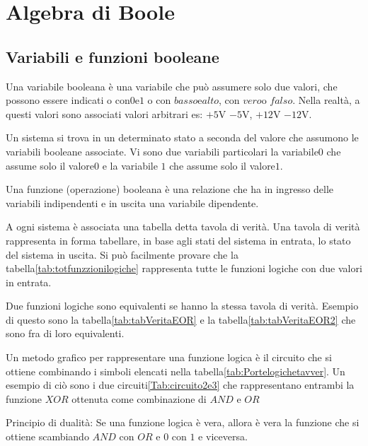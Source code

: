 \chapter{Algebra di Boole}
\label{cha:AlgebradiBoole}
\section{Variabili e funzioni booleane}
\label{sec:VariabiliBooleane}
Una variabile booleana è una variabile che può assumere solo due valori, che possono essere indicati o  con\nobs$0$\nobs e\nobs$1$ o con $basso$\nobs e\nobs$alto$, con $vero$\nobs o \nobs$falso$. Nella realtà, a questi valori sono  associati valori arbitrari es: $+5\si{\volt}$ $-5\si{\volt}$, $+12\si{\volt}$ $-12\si{\volt}$. 

 Un sistema si trova in un determinato stato a seconda del valore che assumono le variabili booleane associate.   Vi sono due variabili  particolari la variabile\nobs$0$ che assume solo il valore\nobs$0$ e la variabile \nobs$1$ che assume solo il valore\nobs$1$. 

Una funzione (operazione) booleana è una relazione  che ha in ingresso delle variabili indipendenti e in uscita una variabile dipendente.

A ogni sistema è associata una tabella detta tavola di verità. Una tavola di verità rappresenta in forma tabellare, in base agli stati del sistema in entrata, lo stato del sistema in uscita. Si può facilmente provare %
che la tabella\vref{tab:totfunzzionilogiche} rappresenta tutte le funzioni logiche con due valori in entrata.

Due funzioni logiche sono equivalenti se hanno la stessa tavola di verità. Esempio di questo sono la tabella\nobs\vref{tab:tabVeritaEOR} e la tabella\nobs\vref{tab:tabVeritaEOR2} che sono fra di loro equivalenti. 

Un metodo grafico per rappresentare una funzione logica  è il circuito che si ottiene combinando i simboli  elencati nella tabella\nobs\vref{tab:Portelogichetavver}. Un esempio di ciò sono  i due circuiti\nobs\vref{Tab:circuito2e3} che rappresentano entrambi la funzione $XOR$  ottenuta come combinazione di $AND$ e $OR$

Principio di dualità: Se una funzione logica è vera, allora è vera la funzione che si ottiene scambiando $AND$ con  $OR$ e  $0$ con $1$ e viceversa.


